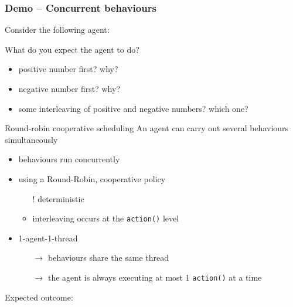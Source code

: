 \documentclass{beamer}\mode<presentation>{\usetheme{AMSCesenaPurpleAndGold}}
\begin{document}
\begin{frame}[allowframebreaks]
    \frametitle{Demo \currentDemo{} -- Concurrent behaviours}

    Consider the following agent:
    

    \bigskip

    What do you expect the agent to do?
    \begin{itemize}
        \item positive number first? why?
        \item negative number first? why?
        \item some \alert{interleaving} of positive and negative numbers? which one?
    \end{itemize}

    \framebreak

    \begin{block}{Round-robin cooperative scheduling}
        An agent can carry out \alert{several} behaviours \alert{simultaneously}
        \begin{itemize}
            \item behaviours run concurrently

            \item using a \alert{Round-Robin}, cooperative policy
            \begin{itemize}
                \item[!] deterministic
                \item interleaving occurs at the \texttt{action()} level
            \end{itemize}

            \item 1-agent-1-thread
            \begin{itemize}
                \item[$\rightarrow$] behaviours share the same thread
                \item[$\rightarrow$] the agent is always executing at most 1 \texttt{action()} at a time
            \end{itemize}
        \end{itemize}
    \end{block}

    \framebreak

    Expected outcome:
    


\end{frame}
\end{document}

